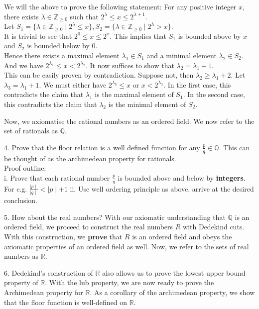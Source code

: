 \documentclass{article}
\begin{document}
We will the above to prove the following statement: For any positive integer $x$, there exists $\lambda \in \mathbb{Z}_{\geq 0}$ such that $2^\lambda \leq x\leq 2^{\lambda+1}$.\\
Let $S_1=\{\lambda \in \mathbb{Z}_{\geq 0} \mid 2^\lambda \leq x\},S_2=\{\lambda \in \mathbb{Z}_{\geq 0} \mid 2^\lambda > x\}$.\\
It is trivial to see that $2^0\leq x \leq 2^x$. This implies that $S_1$ is bounded above by $x$ and $S_2$ is bounded below by 0.\\
Hence there exists a maximal element $\lambda_1\in S_1$ and a minimal element $\lambda_2\in S_2$. And we have $2^{\lambda_1}\leq x < 2^{\lambda_2}$. It now suffices to show that $\lambda_2=\lambda_1+1$.\\
This can be easily proven by contradiction. Suppose not, then $\lambda_2\geq \lambda_1+2$. Let $\lambda_3=\lambda_1+1$. We must either have $2^{\lambda_3}\leq x$ or $x<2^{\lambda_3}$. In the first case, this contradicts the claim that $\lambda_1$ is the maximal element of $S_1$. In the second case, this contradicts the claim that $\lambda_2$ is the minimal element of $S_2$.

Now, we axiomatise the rational numbers as an ordered field. We now refer to the set of rationals as $\mathbb{Q}$.

4. Prove that the floor relation is a well defined function for any $\frac{p}{q}\in \mathbb{Q}$. This can be thought of as the archimedean property for rationals.\\
Proof outline:\\
i. Prove that each rational number $\frac{p}{q}$ is bounded above and below by \textbf{integers}. For e.g. $\frac{\mid p\mid}{\mid q\mid}<\mid p\mid+1$
ii. Use well ordering principle as above, arrive at the desired conclusion.

5. How about the real numbers? With our axiomatic understanding that $\mathbb{Q}$ is an ordered field, we proceed to construct the real numbers $R$ with Dedekind cuts. With this construction, we \textbf{prove} that $R$ is an ordered field and obeys the axiomatic properties of an ordered field as well. Now, we refer to the sets of real numbers as $\mathbb{R}$.

6. Dedekind's construction of $\mathbb{R}$ also allows us to prove the lowest upper bound property of $\mathbb{R}$. With the lub property, we are now ready to prove the Archimedean property for $\mathbb{R}$. As a corollary of the archimedean property, we show that the floor function is well-defined on $\mathbb{R}$.
\end{document}
